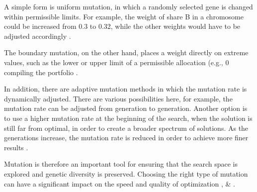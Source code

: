 \documentclass{agasthesis}
\begin{document}
A simple form is uniform mutation, in which a randomly selected gene is changed within permissible limits. For example, 
the weight of share B in a chromosome could be increased from 0.3 to 0.32, while the other weights would have to be adjusted 
accordingly \cite[p. 18]{brzek_exploration-driven_2025}.

The boundary mutation, on the other hand, places a weight directly on extreme values, such as the lower or upper limit of a 
permissible allocation (e.g., 0%
compiling the portfolio \cite[p. 181]{rajakumar_static_2013}.

In addition, there are adaptive mutation methods in which the mutation rate is dynamically adjusted. There are various possibilities here, 
for example, the mutation rate can be adjusted from generation to generation. Another option is to use a higher mutation rate at the beginning 
of the search, when the solution is still far from optimal, in order to create a broader spectrum of solutions. As the generations increase, 
the mutation rate is reduced in order to achieve more finer results \cite[p. 181]{rajakumar_static_2013}.

Mutation is therefore an important tool for ensuring that the search space is explored and genetic diversity is preserved. 
Choosing the right type of mutation can have a significant impact on the speed and quality of optimization \cite{rajakumar_static_2013}, \cite[p. 8 & 129-130]{melanie_introduction_1999} & \cite[p. 471]{kalayci_review_2017}.
\end{document}
